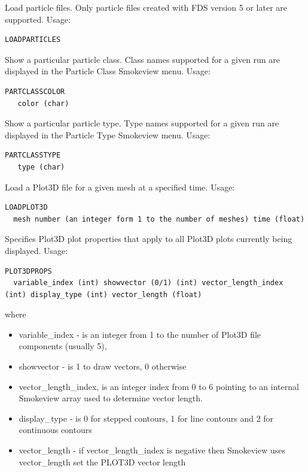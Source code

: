 \documentclass[11pt,twoside]{book}
\newcommand{\hitem}[1]{\item[{\bf #1} \hfill]}
\begin{document}
\hitem{LOADPARTICLES}Load particle files.  Only particle files created with FDS version 5 or
later are supported.
Usage:
\begin{lstlisting}
LOADPARTICLES
\end{lstlisting}

\hitem{PARTCLASSCOLOR}Show a particular particle class.  Class names supported for a given
run are displayed in the Particle Class Smokeview menu.
Usage:
\begin{lstlisting}
PARTCLASSCOLOR
   color (char)
\end{lstlisting}

\hitem{PARTCLASSTYPE}Show a particular particle type.  Type names supported for a given
run are displayed in the Particle Type Smokeview menu.
Usage:
\begin{lstlisting}
PARTCLASSTYPE
   type (char)
\end{lstlisting}

\hitem{LOADPLOT3D}Load a Plot3D file for a given mesh at a specified time.
Usage:
\begin{lstlisting}
LOADPLOT3D
  mesh number (an integer form 1 to the number of meshes) time (float)
\end{lstlisting}

\hitem{PLOT3DPROPS}Specifies Plot3D plot properties that apply to all Plot3D plots currently being displayed.
Usage:
\begin{lstlisting}
PLOT3DPROPS
  variable_index (int) showvector (0/1) (int) vector_length_index (int) display_type (int) vector_length (float)
\end{lstlisting}
where
\begin{itemize}
\item variable\_index - is an integer from 1 to the number of Plot3D file components (usually 5),
\item showvector - is 1 to draw vectors, 0 otherwise
\item vector\_length\_index, is an integer index from 0 to 6 pointing to an internal Smokeview array used to determine vector length.
\item display\_type - is 0 for stepped contours, 1 for line contours and 2 for continuous contours
\item vector\_length - if vector\_length\_index is negative then Smokeview uses vector\_length set the PLOT3D vector length
\end{itemize}
\end{document}
